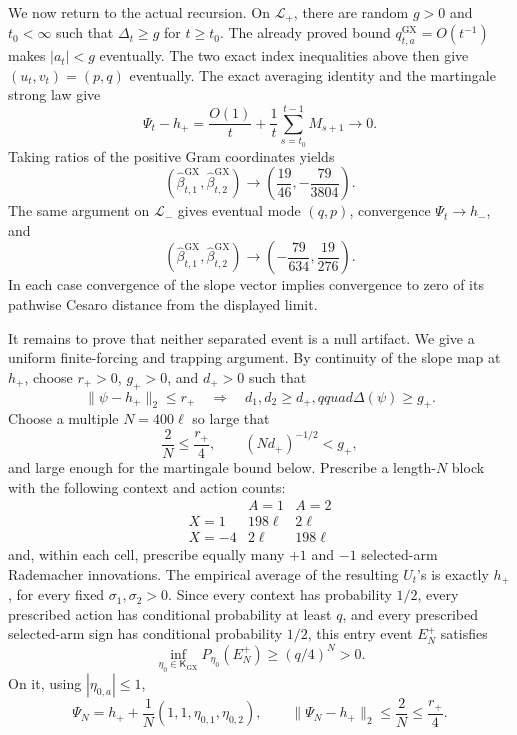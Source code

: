 We now return to the actual recursion.  On \(\mathcal L_+\), there are random \(g>0\) and \(t_0<\infty\) such that \(\Delta_t\ge g\) for \(t\ge t_0\).  The already proved bound \(q^{\mathrm{GX}}_{t,a}=O(t^{-1})\) makes \(|a_t|<g\) eventually.  The two exact index inequalities above then give \((u_t,v_t)=(p,q)\) eventually.  The exact averaging identity and the martingale strong law give
\[
 \Psi_t-h_+
 =\frac{O(1)}t+\frac1t\sum_{s=t_0}^{t-1}M_{s+1}\longrightarrow0.
\]
Taking ratios of the positive Gram coordinates yields
\[
 (\widehat\beta^{\mathrm{GX}}_{t,1},
   \widehat\beta^{\mathrm{GX}}_{t,2})
 \longrightarrow
 \left(\frac{19}{46},-\frac{79}{3804}\right).
\]
The same argument on \(\mathcal L_-\) gives eventual mode \((q,p)\), convergence \(\Psi_t\to h_-\), and
\[
 (\widehat\beta^{\mathrm{GX}}_{t,1},
   \widehat\beta^{\mathrm{GX}}_{t,2})
 \longrightarrow
 \left(-\frac{79}{634},\frac{19}{276}\right).
\]
In each case convergence of the slope vector implies convergence to zero of its pathwise Cesaro distance from the displayed limit.

It remains to prove that neither separated event is a null artifact.  We give a uniform finite-forcing and trapping argument.  By continuity of the slope map at \(h_+\), choose \(r_+>0\), \(g_+>0\), and \(d_+>0\) such that
\[
 \|\psi-h_+\|_2\le r_+
 \quad\Longrightarrow\quad
 d_1,d_2\ge d_+,qquad \Delta(\psi)\ge g_+.
\]
Choose a multiple \(N=400\ell\) so large that
\[
 \frac2N\le\frac{r_+}{4},
 \qquad
 (Nd_+)^{-1/2}<g_+,
\]
and large enough for the martingale bound below.  Prescribe a length-\(N\) block with the following context and action counts:
\[
 \begin{array}{c|cc}
 &A=1&A=2\\ \hline
 X=1&198\ell&2\ell\\
 X=-4&2\ell&198\ell
 \end{array}
\]
and, within each cell, prescribe equally many \(+1\) and \(-1\) selected-arm Rademacher innovations.  The empirical average of the resulting \(U_t\)'s is exactly \(h_+\), for every fixed \(\sigma_1,\sigma_2>0\).  Since every context has probability \(1/2\), every prescribed action has conditional probability at least \(q\), and every prescribed selected-arm sign has conditional probability \(1/2\), this entry event \(E_N^+\) satisfies
\[
 \inf_{\eta_0\in\mathsf K_{\mathrm{GX}}}
 P_{\eta_0}(E_N^+)\ge(q/4)^N>0.
\]
On it, using \(|\eta_{0,a}|\le1\),
\[
 \Psi_N=h_++\frac1N(1,1,\eta_{0,1},\eta_{0,2}),
 \qquad
 \|\Psi_N-h_+\|_2\le\frac2N\le\frac{r_+}{4}.
\]

